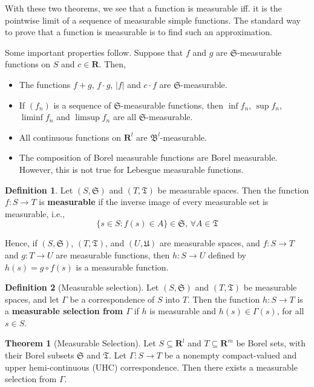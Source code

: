 \documentclass[12pt,a4paper]{article}
\theoremstyle{definition}
\newtheorem{theorem}{Theorem}[section]
\newtheorem{definition}{Definition}[section]
\begin{document}
With these two theorems, we see that a function is measurable iff. it is the pointwise limit of a sequence of measurable simple functions. The standard way to prove that a function is measurable is to find such an approximation.

Some important properties follow. Suppose that $f$ and $g$ are $\mathfrak{S}$-measurable functions on $S$ and $c \in \textbf{R}$. Then,
\begin{itemize}
	\item The functions $f + g$, $f \cdot g$, $|f|$ and $c \cdot f$ are $\mathfrak{S}$-measurable.
	\item If $(f_n)$ is a sequence of $\mathfrak{S}$-measurable functions, then $\inf f_n$, $\sup f_n$, $\liminf f_n$ and $\limsup f_n$ are all $\mathfrak{S}$-measurable.
	\item All continuous functions on $\textbf{R}^l$ are $\mathfrak{B}^l$-measurable.
	\item The composition of Borel measurable functions are Borel measurable. However, this is not true for Lebesgue measurable functions.
\end{itemize}

\begin{definition}
	Let $(S, \mathfrak{S})$ and $(T, \mathfrak{T})$ be measurable spaces. Then the function $f : S \longrightarrow T$ is \textbf{measurable} if the inverse image of every measurable set is measurable, i.e., 
	\[
		\{ s \in S : f(s) \in A \} \in \mathfrak{S}, \, \forall A \in \mathfrak{T}
	\]
\end{definition}

Hence, if $(S, \mathfrak{S})$, $(T, \mathfrak{T})$, and $(U, \mathfrak{U})$ are measurable spaces, and $f : S \longrightarrow T$ and $g : T \longrightarrow U$ are measurable functions, then $h : S \longrightarrow U$ defined by $h(s) = g \circ f(s)$ is a measurable function.

\begin{definition}[Measurable selection]
	Let $(S, \mathfrak{S})$ and $(T, \mathfrak{T})$ be measurable spaces, and let $\Gamma$ be a correspondence of $S$ into $T$. Then the function $h : S \longrightarrow T$ is a \textbf{measurable selection from $\Gamma$} if $h$ is measurable and $h(s) \in \Gamma(s)$, for all $s \in S$.
\end{definition}

\begin{theorem}[Measurable Selection]
	Let $S \subseteq \textbf{R}^l$ and $T \subseteq \textbf{R}^m$ be Borel sets, with their Borel subsets $\mathfrak{S}$ and $\mathfrak{T}$. Let $\Gamma : S \longrightarrow T$ be a nonempty compact-valued and upper hemi-continuous (UHC) correspondence. Then there exists a measurable selection from $\Gamma$.
\end{theorem}
\end{document}
